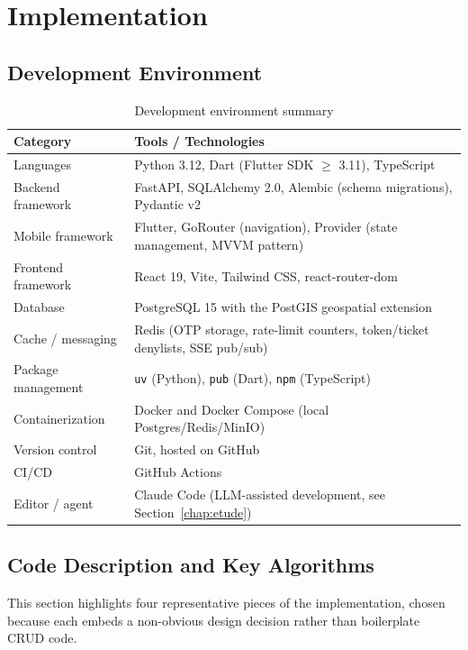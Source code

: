 \chapter{Implementation}
\label{chap:realisation}

\section{Development Environment}

\begin{table}[h!]
\centering
\begin{tabularx}{\textwidth}{lX}
\toprule
\textbf{Category} & \textbf{Tools / Technologies} \\
\midrule
Languages          & Python 3.12, Dart (Flutter SDK $\geq$ 3.11), TypeScript \\
Backend framework  & FastAPI, SQLAlchemy 2.0, Alembic (schema migrations), Pydantic v2 \\
Mobile framework   & Flutter, GoRouter (navigation), Provider (state management, MVVM pattern) \\
Frontend framework & React 19, Vite, Tailwind CSS, react-router-dom \\
Database           & PostgreSQL 15 with the PostGIS geospatial extension \\
Cache / messaging  & Redis (OTP storage, rate-limit counters, token/ticket denylists, SSE pub/sub) \\
Package management & \texttt{uv} (Python), \texttt{pub} (Dart), \texttt{npm} (TypeScript) \\
Containerization    & Docker and Docker Compose (local Postgres/Redis/MinIO) \\
Version control     & Git, hosted on GitHub \\
CI/CD               & GitHub Actions \\
Editor / agent       & Claude Code (LLM-assisted development, see Section~\ref{chap:etude}) \\
\bottomrule
\end{tabularx}
\caption{Development environment summary}
\end{table}

\section{Code Description and Key Algorithms}

This section highlights four representative pieces of the implementation, chosen because each embeds a non-obvious design decision rather than boilerplate CRUD code.

